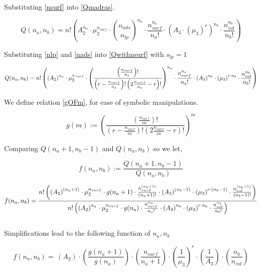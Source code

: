 \documentclass[10pt,letterpaper]{article}
\newcommand{\nads}[1]{
    \ensuremath{
        \frac{
            n_{surf}
        }{
            #1
        }
    }
}
\newcommand{\nlp}[1]{
    \ensuremath{
        r
        -
        \nads{#1}
    }
}
\newcommand{\myQ}[5]{
	\ensuremath{	
		n!
		\left(
		\left(
		A_2
		\right)^{#1}
		\cdot 
		\mu_{2}^{n_{surf}} 
		\cdot 
		#5
		\cdot
		\frac{
		        n_{surf}^{#1}
		    }{
		        #1!
		    }
		\cdot
		\left(
		    A_3
		\right)^{#2}
		\cdot 
		\left(
		    \mu_{3}
		\right)^{r\cdotp #2}
		\cdot
		\frac{
			n_{vol}^{#2}
		}{
			#2!
		}
		\right)
		}
}
\newcommand{\gOFm}[2]{
\left( \frac{
\left(\frac{#2}{#1}\right)!}{ 
\left(r-\frac{#2}{#1}\right)! 
\left(2\frac{#2}{#1}-r\right)!}
\right)^{#1}  
}
\begin{document}
\noindent Substituting \ref{nsurf} into \ref{Qmadras}.

\begin{equation}
	Q(n_a,n_b)=
	n!
	\left(
		A_2^{n_{a}}
		\cdot 
		\mu_{2}^{n_{surf}} 
		\cdot 
		\binom{
			n_{ads}
		}{
			n_{lp}
		}^{n_{a}}
		\cdot
		\frac{
			n_{surf}^{n_{a}}
		}{
			n_a!
		}
		\cdot
		\left(
		A_3
		\cdot
		(\mu_{3})^{r}
	\right)^{n_{b}}
	\cdot
	\frac{
		n_{vol}^{n_{b}}
	}{
		n_b!
	}
	\right)
	\label{Qwithnsurf}
\end{equation}

\noindent Substituting \ref{nlp} and \ref{nads} into \ref{Qwithnsurf}
%
%
with $s_{lp}=1$

\begin{equation}
	Q(n_a,n_b)=\myQ{n_a}{n_b}{\nads{n_a}}{(\nlp{n_a})}{\gOFm{n_a}{n_{surf}}}
	\label{eq. Qab}
\end{equation}

\noindent We define relation \ref{gOFm}, for ease of symbolic manipulations.

\begin{equation}
    \boxed{g(m):= \gOFm{m}{n_{surf}}}
    \label{gOFm}
\end{equation}


\noindent Comparing $Q(n_a+1,n_b-1)$ and $Q(n_a,n_b)$ so we let,

\begin{equation}
    \boxed{f(n_a,n_b):=\frac{Q(n_a+1,n_b-1)}{Q(n_a,n_b)}}
    \label{QfracDEF}
\end{equation}


\begin{equation}
f(n_a,n_b)=
	\frac{
		\myQ{(n_a+1)}{(n_b-1)}{\nads{n_a+1}}{(\nlp{n_a+1})}{g(n_a+1)}
	}{
		\myQ{n_a}{n_b}{\nads{n_a}}{(\nlp{n_a})}{g(n_a)}
	}
	\label{eq. Qratio2}
\end{equation}
\text{}\\

\noindent Simplifications lead to the following function of $n_a,n_b$


\begin{equation}
f(n_a,n_b)=\,
\left(
    A_2
\right)
\cdotp
\left(
	\frac{
		g(n_a+1)
	}{
		g(n_a)
	}
\right)
\cdotp
\left(
    \frac{
    	n_{surf}
    }{
    	n_a+1
    }
\right)
\cdotp
\left(
    \frac{
    	1
    }{
    	\mu_{3}
    }
    \right)^r
\cdot
\left(
    \frac{
        1
    }{
        A_3
    }
\right)
\cdot
\left(
    \frac{
    	n_{b}
    }{
    	n_{vol}	
    } 
\right)
\label{fnanb}
\end{equation}
\end{document}
